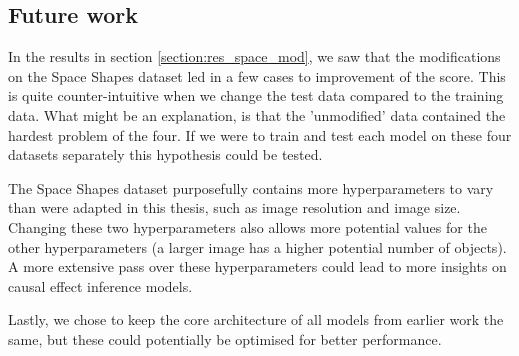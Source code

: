\documentclass{report}
\begin{document}
\subsection{Future work}
In the results in section \ref{section:res_space_mod}, we saw that the modifications on the Space Shapes dataset led in a few cases to improvement of the score. This is quite counter-intuitive when we change the test data compared to the training data. What might be an explanation, is that the 'unmodified' data contained the hardest problem of the four. If we were to train and test each model on these four datasets separately this hypothesis could be tested.

The Space Shapes dataset purposefully contains more hyperparameters to vary than were adapted in this thesis, such as image resolution and image size. Changing these two hyperparameters also allows more potential values for the other hyperparameters (a larger image has a higher potential number of objects). A more extensive pass over these hyperparameters could lead to more insights on causal effect inference models.

Lastly, we chose to keep the core architecture of all models from earlier work the same, but these could potentially be optimised for better performance.






% 
% 
\printbibliography[]
\end{document}

